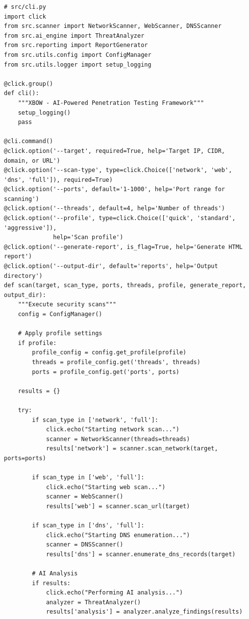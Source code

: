 \documentclass[12pt,a4paper]{report}
\begin{document}
\begin{lstlisting}[caption=CLI Module Source Code]
# src/cli.py
import click
from src.scanner import NetworkScanner, WebScanner, DNSScanner
from src.ai_engine import ThreatAnalyzer
from src.reporting import ReportGenerator
from src.utils.config import ConfigManager
from src.utils.logger import setup_logging

@click.group()
def cli():
    """XBOW - AI-Powered Penetration Testing Framework"""
    setup_logging()
    pass

@cli.command()
@click.option('--target', required=True, help='Target IP, CIDR, domain, or URL')
@click.option('--scan-type', type=click.Choice(['network', 'web', 'dns', 'full']), required=True)
@click.option('--ports', default='1-1000', help='Port range for scanning')
@click.option('--threads', default=4, help='Number of threads')
@click.option('--profile', type=click.Choice(['quick', 'standard', 'aggressive']), 
              help='Scan profile')
@click.option('--generate-report', is_flag=True, help='Generate HTML report')
@click.option('--output-dir', default='reports', help='Output directory')
def scan(target, scan_type, ports, threads, profile, generate_report, output_dir):
    """Execute security scans"""
    config = ConfigManager()
    
    # Apply profile settings
    if profile:
        profile_config = config.get_profile(profile)
        threads = profile_config.get('threads', threads)
        ports = profile_config.get('ports', ports)
    
    results = {}
    
    try:
        if scan_type in ['network', 'full']:
            click.echo("Starting network scan...")
            scanner = NetworkScanner(threads=threads)
            results['network'] = scanner.scan_network(target, ports=ports)
            
        if scan_type in ['web', 'full']:
            click.echo("Starting web scan...")
            scanner = WebScanner()
            results['web'] = scanner.scan_url(target)
            
        if scan_type in ['dns', 'full']:
            click.echo("Starting DNS enumeration...")
            scanner = DNSScanner()
            results['dns'] = scanner.enumerate_dns_records(target)
        
        # AI Analysis
        if results:
            click.echo("Performing AI analysis...")
            analyzer = ThreatAnalyzer()
            results['analysis'] = analyzer.analyze_findings(results)
        

\end{lstlisting}
\end{document}
